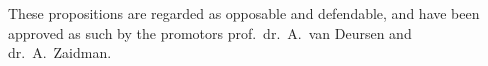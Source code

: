\documentclass{dissertation}
\begin{document}
\begin{center}
These propositions are regarded as opposable and defendable, and have been approved as such by the
promotors prof.\ dr.\ A.\ van Deursen and dr.\ A.\ Zaidman.
\end{center}




















\end{document}
